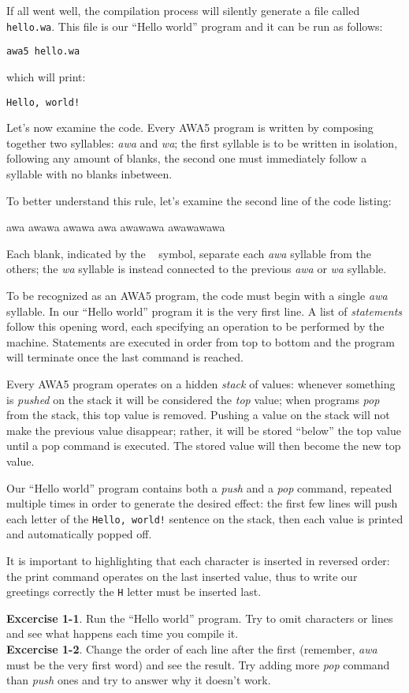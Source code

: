 \documentclass[11pt,a4paper,draft]{book}
\begin{document}
If all went well, the compilation process will silently generate a
file called \verb|hello.wa|. This file is our \enquote{Hello world}
program and it can be run as follows:
\begin{verbatim}
awa5 hello.wa
\end{verbatim}

which will print:
\begin{verbatim}
Hello, world!
\end{verbatim}

Let's now examine the code. Every AWA5 program is written by composing
together two syllables: \emph{awa} and \emph{wa}; the first syllable
is to be written in isolation, following any amount of blanks, the
second one must immediately follow a syllable with no blanks
inbetween.

To better understand this rule, let's examine the second line of the
code listing:
\begin{verbatim*}
awa awawa awawa awa awawawa awawawawa
\end{verbatim*}

Each blank, indicated by the \verb*| | symbol,
separate each \emph{awa} syllable from the others;
the \emph{wa} syllable is instead connected to the
previous \emph{awa} or \emph{wa} syllable.

To be recognized as an AWA5 program, the code must begin with a single
\emph{awa} syllable. In our \enquote{Hello world} program it is the
very first line. A list of \emph{statements} follow this opening word,
each specifying an operation to be performed by the
machine. Statements are executed in order from top to bottom and the
program will terminate once the last command is reached.

Every AWA5 program operates on a hidden \emph{stack} of values:
whenever something is \emph{pushed} on the stack it will be considered
the \emph{top} value; when programs \emph{pop} from the stack, this
top value is removed. Pushing a value on the stack will not make the
previous value disappear; rather, it will be stored \enquote{below}
the top value until a pop command is executed. The stored value will
then become the new top value.

Our \enquote{Hello world} program contains both a \emph{push} and a
\emph{pop} command, repeated multiple times in order to generate the
desired effect: the first few lines will push each letter of the
\verb|Hello, world!| sentence on the stack, then each value is printed
and automatically popped off.

It is important to highlighting that each character is inserted in
reversed order: the print command operates on the last inserted value,
thus to write our greetings correctly the \verb|H| letter must be
inserted last.

\textbf{Excercise 1-1}. Run the \enquote{Hello world} program. Try to
omit characters or lines and see what happens each time you compile
it. \\
\textbf{Excercise 1-2}. Change the order of each line after the first
(remember, \emph{awa} must be the very first word) and see the
result. Try adding more \emph{pop} command than \emph{push} ones and
try to answer why it doesn't work.
\end{document}
